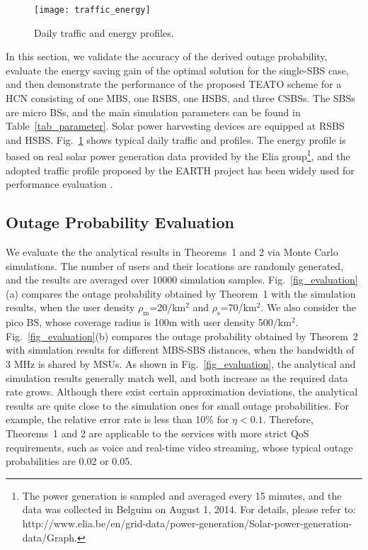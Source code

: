 \documentclass[12pt, draftclsnofoot,onecolumn]{IEEEtran}
\begin{document}
\begin{figure}
  \centering
  \texttt{[image: traffic\_energy]}\\
  \caption{Daily traffic and energy profiles.}\label{fig_traffic_energy}
\end{figure}


In this section, we validate the accuracy of the derived outage probability, evaluate the energy saving gain of the optimal solution for the single-SBS case, and then demonstrate the performance of the proposed TEATO scheme for a HCN consisting of one MBS, one RSBS, one HSBS, and three CSBSs.
The SBSs are micro BSs, and the main simulation parameters can be found in Table~\ref{tab_parameter}.
Solar power harvesting devices are equipped at RSBS and HSBS.
Fig.~\ref{fig_traffic_energy} shows typical daily traffic and profiles.
The energy profile is based on real solar power generation data provided by the Elia group\footnote{The power generation is sampled and averaged every 15 minutes, and the data was collected in Belguim on August 1, 2014. For details, please refer to: http://www.elia.be/en/grid-data/power-generation/Solar-power-generation-data/Graph.}, and the adopted traffic profile proposed by the EARTH project has been widely used for performance evaluation \cite{JGong_TC} \cite{EARTH}.

    \begin{figure*}[!t]
        \centering
        \hfil
        \caption{Outage probability.}
        \label{fig_evaluation}
    \end{figure*}

\subsection{Outage Probability Evaluation}

We evaluate the the analytical results in Theorems~1 and 2 via Monte Carlo simulations.
The number of users and their locations are randomly generated, and the results are averaged over 10000 simulation samples. Fig.~\ref{fig_evaluation}(a) compares the outage probability obtained by Theorem~1 with the simulation results, when the user density $\rho_\mathrm{m}$=20/km$^2$ and $\rho_\mathrm{s}$=70/km$^2$. We also consider the pico BS, whose coverage radius is 100m with user density 500/km$^2$.
Fig.~\ref{fig_evaluation}(b) compares the outage probability obtained by Theorem~2 with simulation results for different MBS-SBS distances, when the bandwidth of 3 MHz is shared by MSUs.
As shown in Fig.~\ref{fig_evaluation}, the analytical and simulation results generally match well, and both increase as the required data rate grows.
Although there exist certain approximation deviations, the analytical results are quite close to the simulation ones for small outage probabilities.
For example, the relative error rate is less than 10\% for $\eta<0.1$.
Therefore, Theorems~1 and 2 are applicable to the services with more strict QoS requirements, such as voice and real-time video streaming, whose typical outage probabilities are 0.02 or 0.05.
\end{document}
